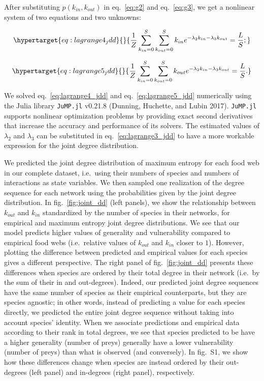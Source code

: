 \documentclass[10pt,oneside]{article}
\begin{document}
After substituting \(p(k_{in},k_{out})\) in eq.~\ref{eq:g2} and
eq.~\ref{eq:g3}, we get a nonlinear system of two equations and two
unknowns:

\begin{equation}\protect\hypertarget{eq:lagrange4_jdd}{}{\frac{1}{Z}\sum_{k_{in}=0}^S\sum_{k_{out}=0}^S k_{in} e^{-\lambda_2k_{in}-\lambda_3k_{out}}  = \frac{L}{S};}\label{eq:lagrange4_jdd}\end{equation}

\begin{equation}\protect\hypertarget{eq:lagrange5_jdd}{}{\frac{1}{Z}\sum_{k_{in}=0}^S\sum_{k_{out}=0}^S k_{out} e^{-\lambda_2k_{in}-\lambda_3k_{out}}  = \frac{L}{S}.}\label{eq:lagrange5_jdd}\end{equation}

We solved eq.~\ref{eq:lagrange4_jdd} and eq.~\ref{eq:lagrange5_jdd}
numerically using the Julia library \texttt{JuMP.jl} v0.21.8 (Dunning,
Huchette, and Lubin 2017). \texttt{JuMP.jl} supports nonlinear
optimization problems by providing exact second derivatives that
increase the accuracy and performance of its solvers. The estimated
values of \(\lambda_2\) and \(\lambda_3\) can be substituted in
eq.~\ref{eq:lagrange3_jdd} to have a more workable expression for the
joint degree distribution.

We predicted the joint degree distribution of maximum entropy for each
food web in our complete dataset, i.e.~using their numbers of species
and numbers of interactions as state variables. We then sampled one
realization of the degree sequence for each network using the
probabilities given by the joint degree distribution. In
fig.~\ref{fig:joint_dd} (left panels), we show the relationship between
\(k_{out}\) and \(k_{in}\) standardized by the number of species in
their networks, for empirical and maximum entropy joint degree
distributions. We see that our model predicts higher values of
generality and vulnerability compared to empirical food webs
(i.e.~relative values of \(k_{out}\) and \(k_{in}\) closer to \(1\)).
However, plotting the difference between predicted and empirical values
for each species gives a different perspective. The right panel of
fig.~\ref{fig:joint_dd} presents these differences when species are
ordered by their total degree in their network (i.e.~by the sum of their
in and out-degrees). Indeed, our predicted joint degree sequences have
the same number of species as their empirical counterparts, but they are
species agnostic; in other words, instead of predicting a value for each
species directly, we predicted the entire joint degree sequence without
taking into account species' identity. When we associate predictions and
empirical data according to their rank in total degrees, we see that
species predicted to be have a higher generality (number of preys)
generally have a lower vulnerability (number of preys) than what is
observed (and conversely). In fig.~S1, we show how these differences
change when species are instead ordered by their out-degrees (left
panel) and in-degrees (right panel), respectively.
\end{document}
